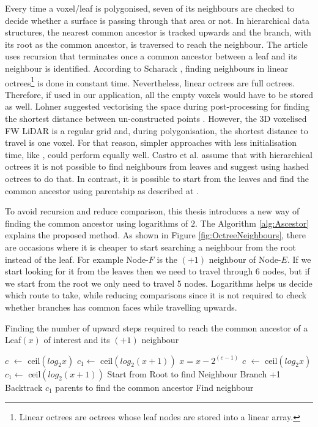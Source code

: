 \documentclass{subfiles}
\begin{document}
\par Every time a voxel/leaf is polygonised, seven of its neighbours are checked to decide whether a surface is passing through that area or not. In hierarchical data structures, the nearest common ancestor is tracked upwards and the branch, with its root as the common ancestor, is traversed to reach the neighbour. The article \cite{Hanan1989} uses recursion that terminates once a common ancestor between a leaf and its neighbour is identified. According to Scharack \cite{Schrack1992}, finding neighbours in linear octrees\footnote{{\color{blue} Linear octrees are octrees whose leaf nodes are stored into a linear array. }} is done in constant time. Nevertheless, linear octrees are full octrees. Therefore, if used in our application, all the empty voxels would have to be stored as well. Lohner suggested vectorising the space during post-processing for finding the shortest distance between un-constructed points \cite{Lohner1994}. However, the 3D voxelised FW LiDAR is a regular grid and, during polygonisation, the shortest distance to travel is one voxel. For that reason, simpler approaches with less initialisation time, like \cite{Schrack1992}, could perform equally well. Castro et al. \cite{Castro2008} assume that with hierarchical octrees it is not possible to find neighbours from leaves and suggest using hashed octrees to do that. In contrast, it is possible to start from the leaves and find the common ancestor using parentship as described at \cite{Hanan1989}.

\par To avoid recursion and reduce comparison, this thesis introduces a new way of finding the  common ancestor using logarithms of $2$. The Algorithm \ref{alg:Ascestor} explains the proposed method. As shown in Figure \ref{fig:OctreeNeighbours}, there are occasions where it is cheaper to start searching a neighbour from the root instead of the leaf. For example Node-$F$ is the $(+1)$ neighbour of Node-$E$. If we start looking for it from the leaves then we need to travel through 6 nodes, but if we start from the root we only need to travel 5 nodes. Logarithms helps us decide which route to take, while reducing comparisons since it is not required to check whether branches has common faces while travelling upwards\cite{Hanan1989}.

\begin{algorithm}[!htbp]
	\caption{Finding the number of upward steps required to reach the common ancestor of a Leaf$(x)$ of interest and its $(+1)$ neighbour}
	\label{alg:Ascestor}
	\centering
	\begin{algorithmic}[1]
		\State $c $  $\gets$ ceil$(log_2 x)$
		\State $c_1 \gets$ ceil$(log_2 (x+1))$
		\State $x = x - 2^{(c-1)} $
		\State $c $  $\gets$ ceil$(log_2 x)$
		\State $c_1 \gets$ ceil$(log_2 (x+1))$		
		\EndWhile
		\State Start from Root to find Neighbour Branch +1
		\Else
		\State Backtrack $c_1$ parents to find the common ancestor
		\State Find neighbour
		\EndIf
	\end{algorithmic}
\end{algorithm}
\end{document}
